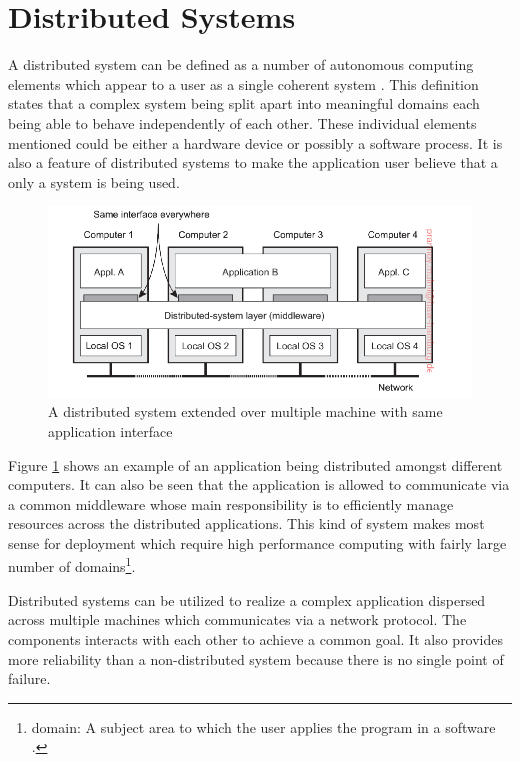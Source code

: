 \section{Distributed Systems}

    A distributed system can be defined as a number of autonomous computing elements which 
    appear to a user as a single coherent system \cite[p.~2]{DistributedSystems}. 
    This definition states that a complex system being split apart into meaningful domains
    each being able to behave independently of each other. These individual elements 
    mentioned could be either a hardware device or possibly a software process. It is also 
    a feature of distributed systems to make the application user believe that a only a system 
    is being used. 

    \begin{figure}[htbp!]
        \centering \includegraphics[scale=0.94]{grafiken/distributedSystem.png}
        \caption{A distributed system extended over multiple machine with same application 
        interface \cite[p.~5]{DistributedSystems}}
        \label{fig:distributedSystem}
    \end{figure}

    \newpage
    \par
        Figure \ref{fig:distributedSystem} shows an example of an application being 
        distributed amongst different computers. It can also be seen that the application
        is allowed to communicate via a common middleware whose main responsibility is to
        efficiently manage resources across the distributed applications. This kind of system
        makes most sense for deployment which require high performance computing with fairly
        large number of domains\footnote{domain: A subject area to which the user applies the program in a 
        software \cite{DDD}.}.

    \par
        Distributed systems can be utilized to realize a complex application dispersed across
        multiple machines which communicates via a network protocol. The 
        components interacts with each other to achieve a common goal. It also provides
        more reliability than a non-distributed system because there is no single point
        of failure. 

